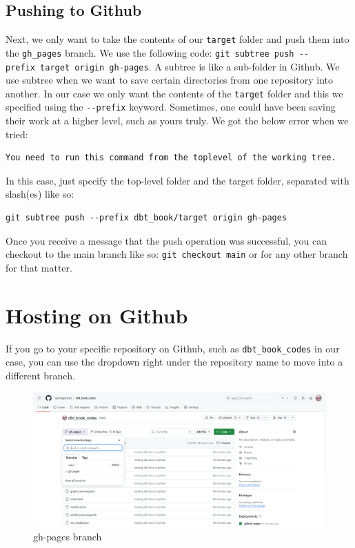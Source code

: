 \documentclass[
]{book}
\begin{document}
\hypertarget{pushing-to-github}{%
\subsection{Pushing to Github}\label{pushing-to-github}}

Next, we only want to take the contents of our \texttt{target} folder and push them into the \texttt{gh\_pages} branch. We use the following code: \texttt{git\ subtree\ push\ -\/-prefix\ target\ origin\ gh-pages}. A subtree is like a sub-folder in Github. We use subtree when we want to save certain directories from one repository into another. In our case we only want the contents of the \texttt{target} folder and this we specified using the \texttt{-\/-prefix} keyword. Sometimes, one could have been saving their work at a higher level, such as yours truly. We got the below error when we tried:

\begin{verbatim}
You need to run this command from the toplevel of the working tree.
\end{verbatim}

In this case, just specify the top-level folder and the target folder, separated with slash(es) like so:

\begin{verbatim}
git subtree push --prefix dbt_book/target origin gh-pages
\end{verbatim}

Once you receive a message that the push operation was successful, you can checkout to the main branch like so: \texttt{git\ checkout\ main} or for any other branch for that matter.

\hypertarget{hosting-on-github}{%
\section{Hosting on Github}\label{hosting-on-github}}

If you go to your specific repository on Github, such as \texttt{dbt\_book\_codes} in our case, you can use the dropdown right under the repository name to move into a different branch.

\begin{figure}
\centering
\includegraphics{./images/gh-pages-branch.png}
\caption{gh-pages branch}
\end{figure}
\end{document}
